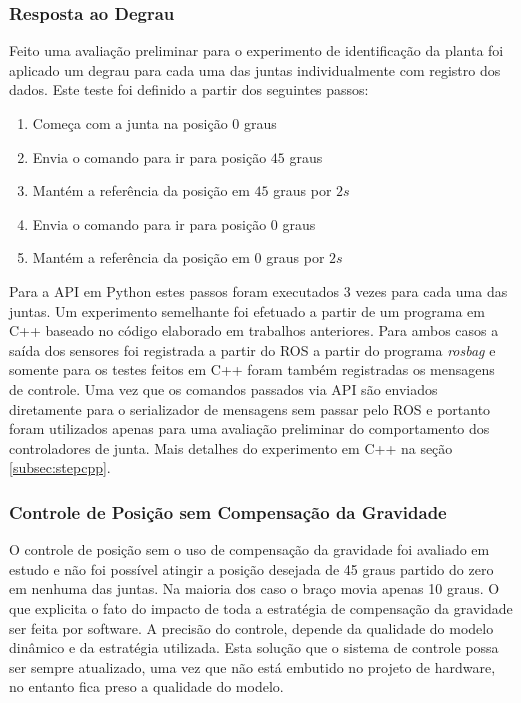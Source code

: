 
\subsubsection{Resposta ao Degrau}

Feito uma avaliação preliminar para o experimento de identificação da planta foi aplicado um degrau para cada uma das juntas individualmente com registro dos dados. Este teste foi definido a partir dos seguintes passos:

\begin{enumerate}
    \item Começa com a junta na posição $0$ graus
    \item Envia o comando para ir para posição $45$ graus
    \item Mantém a referência da posição em $45$ graus por $2s$
    \item Envia o comando para ir para posição $0$ graus
    \item Mantém a referência da posição em $0$ graus por $2s$
\end{enumerate}

Para a API em Python estes passos foram executados 3 vezes para cada uma das juntas. Um experimento semelhante foi efetuado a partir de um programa em C++ baseado no código elaborado em trabalhos anteriores. Para ambos casos a saída dos sensores foi registrada a partir do ROS a partir do programa \textit{rosbag} e somente para os testes feitos em C++ foram também registradas os mensagens de controle. Uma vez que os comandos passados via API são enviados diretamente para o serializador de mensagens sem passar pelo ROS e portanto foram utilizados apenas para uma avaliação preliminar do comportamento dos controladores de junta. Mais detalhes do experimento em C++ na seção \ref{subsec:stepcpp}. 


\subsubsection{Controle de Posição sem Compensação da Gravidade}

O controle de posição sem o uso de compensação da gravidade foi avaliado em estudo e não foi possível atingir a posição desejada de 45 graus partido do zero em nenhuma das juntas. Na maioria dos caso o braço movia apenas 10 graus. O que explicita o fato do impacto de toda a estratégia de compensação da gravidade ser feita por software. A precisão do controle, depende da qualidade do modelo dinâmico e da estratégia utilizada. Esta solução que o sistema de controle possa ser sempre atualizado, uma vez que não está embutido no projeto de hardware, no entanto fica preso a qualidade do modelo.

